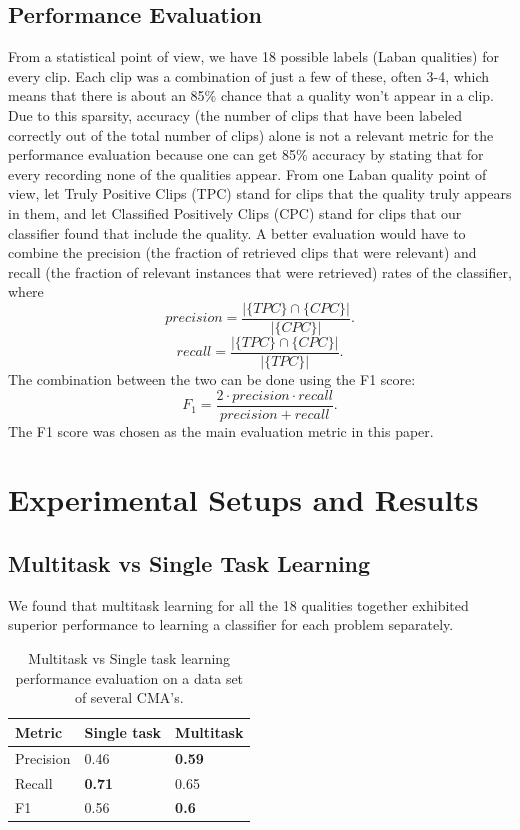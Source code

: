 \documentclass[11pt,twocolumn,varwidth=true,a4paper,fleqn]{sigchi}
\begin{document}
\subsection{Performance Evaluation}
From a statistical point of view, we have 18 possible labels (Laban qualities) for every clip. 
Each clip was a combination of just a few of these, often 3-4, which means that there is about 
an 85\% chance that a quality won't appear in a clip. Due to this sparsity,
accuracy (the number of clips that have been labeled correctly out of the
total number of clips) alone is not a relevant metric for the performance
evaluation because one can get 85\% accuracy by stating that for every recording none of the qualities appear.
From one Laban quality point of view, let Truly Positive Clips (TPC) stand for clips that the quality truly appears in them, and let Classified Positively Clips (CPC) stand for clips that our classifier found that include the quality. A better evaluation would have to combine the precision (the fraction of retrieved clips that were relevant) and recall (the fraction of relevant instances that were retrieved) rates of the
classifier, where
\begin{equation*}
precision = \frac{|\{TPC\}\cap\{CPC\}|}{|\{CPC\}|}.
\end{equation*}
\begin{equation*}
recall = \frac{|\{TPC\}\cap\{CPC\}|}{|\{TPC\}|}.
\end{equation*}
 The combination between the two can be done using the F1 score:
\begin{equation*}
F_{1} = \frac{2\cdot precision\cdot recall}{precision+recall}.
\end{equation*}
The F1 score was chosen as the main evaluation metric in this paper.
\section{Experimental Setups and Results}

\subsection{Multitask vs Single Task Learning}
We found that multitask learning for all the 18 qualities together exhibited superior
performance to learning a classifier for each problem separately.
\begin{table}[ht]
\centering
\begin{tabular}{|p{1.8cm}|p{1.8cm}|p{1.8cm}|}
\hline
Metric&Single task&Multitask\\\hline
Precision&0.46&\textbf{0.59}\\\hline
Recall&\textbf{0.71}&0.65\\\hline
F1&0.56&\textbf{0.6}\\\hline
\end{tabular}
\caption{Multitask vs Single task learning performance evaluation on a data set of several CMA's.}
\label{MultitaskVsSeparated}
\end{table}
\end{document}

